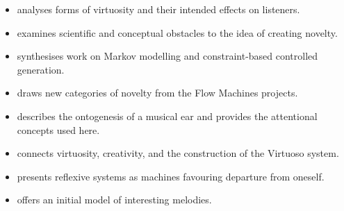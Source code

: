 \documentclass[11pt,a4paper]{article}
\begin{document}
\begin{itemize}
  \item \textcite{pachet2026virtuosite} analyses forms of virtuosity and their
        intended effects on listeners.
  \item \textcite{pachet2026impossibilite} examines scientific and conceptual
        obstacles to the idea of creating novelty.
  \item \textcite{pachet2026markov} synthesises work on Markov modelling and
        constraint-based controlled generation.
  \item \textcite{pachet2021assisted} draws new categories of novelty from the
        Flow Machines projects.
  \item \textcite{pachet2018oreille} describes the ontogenesis of a musical ear
        and provides the attentional concepts used here.
  \item \textcite{pachet2012virtuosity} connects virtuosity, creativity, and the
        construction of the Virtuoso system.
  \item \textcite{pachet2008machines} presents reflexive systems as machines
        favouring departure from oneself.
  \item \textcite{pachet2006clefs} offers an initial model of interesting
        melodies.
\end{itemize}

\printbibliography[title={References}]
\end{document}
